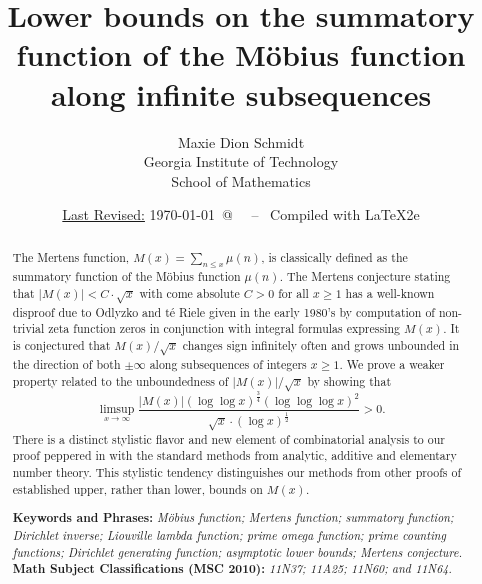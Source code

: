 \documentclass[11pt,reqno,a4letter]{article}
\title{
       \LARGE{
       Lower bounds on the summatory function of the M\"obius function along infinite subsequences 
       } 
}
\author{{\Large Maxie Dion Schmidt} \\ 
        {\normalsize Georgia Institute of Technology} \\[0.025cm] 
        {\normalsize School of Mathematics} 
}
\date{\small\underline{Last Revised:} \today \ @\ \hhmmsstime{} \ -- \ Compiled with \LaTeX2e}
\numberwithin{figure}{section}
\numberwithin{table}{section}
\theoremstyle{plain}
\numberwithin{theorem}{section}
\theoremstyle{definition}
\begin{document}
 

\maketitle

\begin{abstract} 
The Mertens function, $M(x) = \sum_{n \leq x} \mu(n)$, is classically 
defined as the summatory function of the M\"obius function $\mu(n)$. 
The Mertens conjecture stating that $|M(x)| < C \cdot \sqrt{x}$ with come absolute $C > 0$ for all 
$x \geq 1$ has a well-known disproof due to Odlyzko and t\'{e} Riele given in the early 1980's by computation of 
non-trivial zeta function zeros in conjunction with integral formulas expressing $M(x)$. 
It is conjectured that $M(x) / \sqrt{x}$ changes sign infinitely often and grows 
unbounded in the direction of both $\pm \infty$ along subsequences of integers $x \geq 1$. 
We prove a weaker property related to the unboundedness of $|M(x)| / \sqrt{x}$ by showing that 
$$\limsup_{x \rightarrow \infty} \frac{|M(x)| (\log\log x)^{\frac{3}{4}} (\log\log\log x)^{2}}{ 
  \sqrt{x} \cdot (\log x)^{\frac{1}{2}}} > 0.$$ 
There is a distinct stylistic 
flavor and new element of combinatorial analysis to our proof 
peppered in with the standard methods from analytic, additive and elementary number theory. 
This stylistic tendency distinguishes 
our methods from other proofs of established upper, rather than lower, bounds on $M(x)$. 

\bigskip 
\noindent
\textbf{Keywords and Phrases:} {\it M\"obius function; Mertens function; summatory function; 
                                    Dirichlet inverse; Liouville lambda function; prime omega function; 
                                    prime counting functions; Dirichlet generating function; 
                                    asymptotic lower bounds; Mertens conjecture. } \\ 
\textbf{Math Subject Classifications (MSC 2010):} {\it 11N37; 11A25; 11N60; and 11N64. } 
\end{abstract} 
\end{document}
